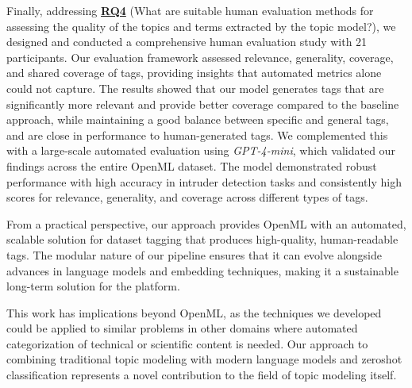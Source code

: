 Finally, addressing \hyperref[rq4]{\textbf{RQ4}} (What are suitable human evaluation methods for assessing the quality of the topics and terms extracted by the topic model?), we designed and conducted a comprehensive human evaluation study with 21 participants. Our evaluation framework assessed relevance, generality, coverage, and shared coverage of tags, providing insights that automated metrics alone could not capture. The results showed that our model generates tags that are significantly more relevant and provide better coverage compared to the baseline approach, while maintaining a good balance between specific and general tags, and are close in performance to human-generated tags. We complemented this with a large-scale automated evaluation using \textit{GPT-4-mini}, which validated our findings across the entire OpenML dataset. The model demonstrated robust performance with high accuracy in intruder detection tasks and consistently high scores for relevance, generality, and coverage across different types of tags.

From a practical perspective, our approach provides OpenML with an automated, scalable solution for dataset tagging that produces high-quality, human-readable tags. The modular nature of our pipeline ensures that it can evolve alongside advances in language models and embedding techniques, making it a sustainable long-term solution for the platform.

This work has implications beyond OpenML, as the techniques we developed could be applied to similar problems in other domains where automated categorization of technical or scientific content is needed. Our approach to combining traditional topic modeling with modern language models and zeroshot classification represents a novel contribution to the field of topic modeling itself.
